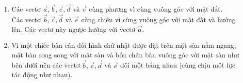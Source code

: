 \begin{bt}
{\begin{enumerate}
			\item Các vectơ $\overrightarrow{a}, \overrightarrow{b}, \overrightarrow{c}, \overrightarrow{d}$ và $\overrightarrow{e}$ cùng phương vì cùng vuông góc với mặt đất.\\
			Các vectơ $\overrightarrow{b}, \overrightarrow{c}, \overrightarrow{d}$ và $\overrightarrow{e}$ cùng chiều vì cùng vuông góc với mặt đất và hướng lên. Các vectơ này ngược hướng với vectơ $\overrightarrow{a}$.
			\item 	Vì một chiếc bàn cân đối hình chữ nhật được đặt trên mặt sàn nằm ngang, mặt bàn song song với mặt sàn và bốn chân bàn vuông góc với mặt sàn như bên dưới nên các vectơ $\overrightarrow{b}, \overrightarrow{c}, \overrightarrow{d}$ và $\overrightarrow{e}$ đôi một bằng nhau (cùng chịu một lực tác động như nhau).
		\end{enumerate}
	}
\end{bt}

